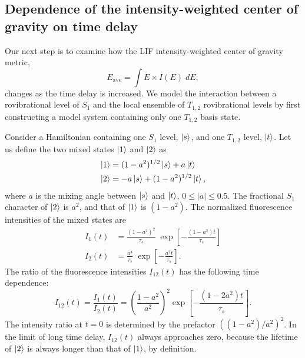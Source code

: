 \subsection{Dependence of the intensity-weighted center of gravity on
  time delay}

Our next step is to examine how the LIF intensity-weighted center of
gravity metric,
\begin{equation}
  E_{\text{ave}} = \int E \times I(E) \; dE,
\end{equation}
changes as the time delay is increased.  We model the interaction
between a rovibrational level of $S_1$ and the local ensemble of
$T_{1,2}$ rovibrational levels by first constructing a model system
containing only one $T_{1,2}$ basis state.


Consider a Hamiltonian containing one $S_1$ level, $\mathinner{|{s}\rangle}$, and one
$T_{1,2}$ level, $\mathinner{|{t}\rangle}$.  Let us define the two mixed states
$\mathinner{|{1}\rangle}$ and $\mathinner{|{2}\rangle}$ as
\begin{equation}
  \begin{split}
    \mathinner{|{1}\rangle} &=  (1 - a^2)^{1/2} \mathinner{|{s}\rangle} + a \mathinner{|{t}\rangle}\\
    \mathinner{|{2}\rangle} &= -a \mathinner{|{s}\rangle} + (1 - a^2)^{1/2} \mathinner{|{t}\rangle},
  \end{split}
\end{equation}
where $a$ is the mixing angle between $\mathinner{|{s}\rangle}$ and $\mathinner{|{t}\rangle}$, $0 \leq
\lvert a \rvert \leq 0.5$.  The fractional $S_1$ character of
$\mathinner{|{2}\rangle}$ is $a^2$, and that of $\mathinner{|{1}\rangle}$ is $(1 - a^2)$.  The
normalized fluorescence intensities of the mixed states are
\begin{equation}
  \begin{split}
    I_1(t) &= \frac{(1 - a^2)^2}{\tau_s} \; \exp 
          \left[
            - \frac{(1 - a^2) t}{\tau_s}
          \right]\\
    I_2(t) &= \frac{a^4}{\tau_s} \; \exp 
          \left[
            - \frac{a^2 t}{\tau_s}
          \right].
  \end{split}
\end{equation}
The ratio of the fluorescence intensities $I_{12}(t)$ has the
following time dependence:
\begin{equation}
  I_{12}(t) = \frac{I_1(t)}{I_2(t)} = 
  \left(
    \frac{1 - a^2}{a^2}
  \right)^2
  \exp
  \left[
    - \frac{(1 - 2a^2) t}{\tau_s}
  \right].
\end{equation}  
The intensity ratio at $t=0$ is determined by the prefactor $( (1 -
a^2)/a^2 )^2$.  In the limit of long time delay, $I_{12}(t)$
always approaches zero, because the lifetime of $\mathinner{|{2}\rangle}$ is always
longer than that of $\mathinner{|{1}\rangle}$, by definition.  

